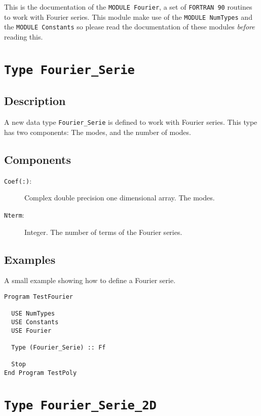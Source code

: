 This is the documentation of the \texttt{MODULE Fourier}, a set
of \texttt{FORTRAN 90} routines to work with Fourier series. This
module make use of the \texttt{MODULE NumTypes} and the
\texttt{MODULE Constants} so please read the documentation of these
modules \emph{before} reading this. 

\section{\texttt{Type Fourier\_Serie}}

\subsection{Description}

A new data type \texttt{Fourier\_Serie} is defined to work with
Fourier series. This type has two components: The modes, and the
number of modes.

\subsection{Components}

\begin{description}
\item[\texttt{Coef(:)}: ] Complex double precision one dimensional
  array. The modes.
\item[\texttt{Nterm}:] Integer. The number of terms of the Fourier
  series. 
\end{description}

\subsection{Examples}

A small example showing how to define a Fourier serie.

\begin{lstlisting}[emph=Type,
                   emphstyle=\color{blue},
                   frame=trBL,
                   caption=Defining a Fourier serie.,
                   label=typef]
Program TestFourier

  USE NumTypes
  USE Constants
  USE Fourier

  Type (Fourier_Serie) :: Ff

  Stop
End Program TestPoly
\end{lstlisting}

\section{\texttt{Type Fourier\_Serie\_2D}}

